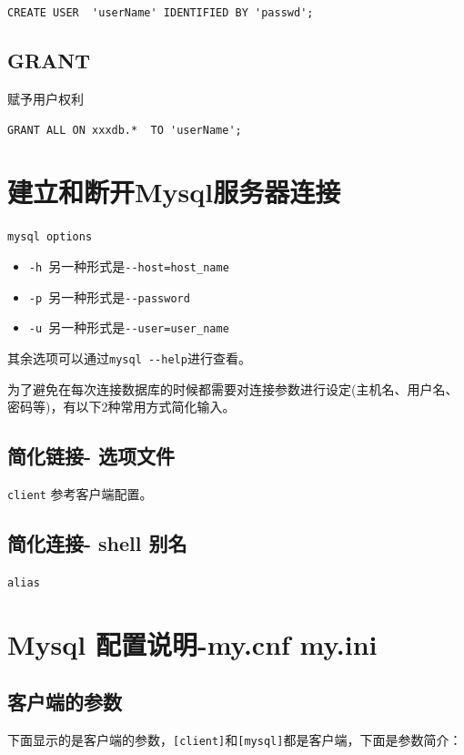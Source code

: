\documentclass[UTF8,a4paper,12pt]{ctexbook}
\begin{document}
			\verb|CREATE USER  'userName' IDENTIFIED BY 'passwd';| 
			
		\subsection{GRANT}
			赋予用户权利
			
			\verb|GRANT ALL ON xxxdb.*  TO 'userName';| 
	
	
	\section{建立和断开Mysql服务器连接}
		\verb|mysql options|
		
		\begin{itemize}[itemindent = 1em]
			\item \verb|-h |另一种形式是\verb|--host=host_name|
			\item \verb|-p |另一种形式是\verb|--password|
			\item \verb|-u |另一种形式是\verb|--user=user_name|
		\end{itemize}
		
			其余选项可以通过\verb|mysql --help|进行查看。
				
			为了避免在每次连接数据库的时候都需要对连接参数进行设定(主机名、用户名、密码等)，有以下2种常用方式简化输入。
			
		\subsection{简化链接- 选项文件}
			\verb|client| 参考客户端配置。
		
		\subsection{简化连接- shell 别名}
			\verb|alias| 
		
		
	
	\newpage
	\section{Mysql 配置说明-my.cnf my.ini}
		
		\subsection{客户端的参数}
			下面显示的是客户端的参数，\verb|[client]|和\verb|[mysql]|都是客户端，下面是参数简介：
			
\end{document}
